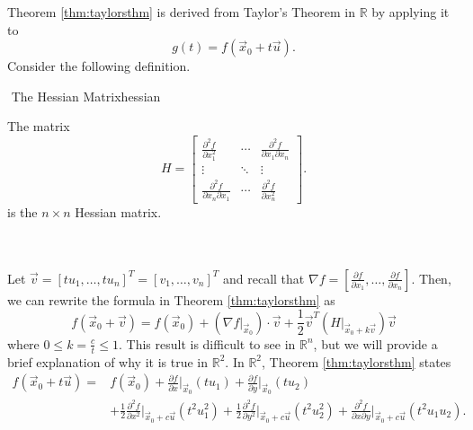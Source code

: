     Theorem \ref{thm:taylorsthm} is derived from Taylor's Theorem in \(\mathbb{R}\) by applying it to
    \begin{equation*}
        g(t)=f(\vec{x}_0+t\vec{u}).
    \end{equation*}
    Consider the following definition.
    \begin{definition}{\Stop\,\,The Hessian Matrix}{hessian}

        The matrix
        \begin{equation*}
            H=\begin{bmatrix}
                \frac{\partial^2f}{\partial x_1^2} & \cdots & \frac{\partial^2f}{\partial x_1\partial x_n} \\
                \vdots & \ddots & \vdots \\
                \frac{\partial^2f}{\partial x_n\partial x_1} & \cdots & \frac{\partial^2f}{\partial x_n^2}
            \end{bmatrix}.
        \end{equation*}
        is the \(n\times n\) Hessian matrix.
        
    \end{definition}
    \vphantom
    \\
    \\
    Let \(\vec{v}=[tu_1,\ldots,tu_n]^T=[v_1,\ldots,v_n]^T\) and recall that \(\nabla f=\left[\frac{\partial f}{\partial x_1},\ldots,\frac{\partial f}{\partial x_n}\right]\). Then, we can rewrite the formula in Theorem \ref{thm:taylorsthm} as
    \begin{equation*}
        f(\vec{x}_0+\vec{v})=f(\vec{x}_0)+\left(\nabla f\Big|_{\vec{x}_0}\right)\cdot\vec{v}+\frac{1}{2}\vec{v}^T\left(H\Big|_{\vec{x}_0+k\vec{v}}\right)\vec{v}
    \end{equation*}
    where \(0\leq k=\frac{c}{t}\leq 1\). This result is difficult to see in \(\mathbb{R}^n\), but we will provide a brief explanation of why it is true in \(\mathbb{R}^2\). In \(\mathbb{R}^2\), Theorem \ref{thm:taylorsthm} states
    \begin{align*}
        f(\vec{x}_0+t\vec{u})=&f(\vec{x}_0)+\frac{\partial f}{\partial x}\Big|_{\vec{x}_0}(tu_1)+\frac{\partial f}{\partial y}\Big|_{\vec{x}_0}(tu_2)\\&+\frac{1}{2}\frac{\partial^2 f}{\partial x^2}\Big|_{\vec{x}_0+c\vec{u}}(t^2u_1^2)+\frac{1}{2}\frac{\partial^2 f}{\partial y^2}\Big|_{\vec{x}_0+c\vec{u}}(t^2u_2^2)+\frac{\partial^2f}{\partial x\partial y}\Big|_{\vec{x}_0+c\vec{u}}(t^2u_1u_2).
    \end{align*}
